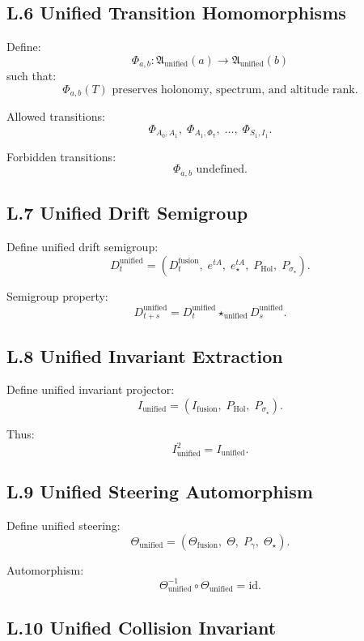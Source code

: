 \subsection*{L.6 Unified Transition Homomorphisms}

Define:
\[
\Phi_{a,b} :
\mathfrak{A}_{\mathrm{unified}}(a)
\to
\mathfrak{A}_{\mathrm{unified}}(b)
\]
such that:
\[
\Phi_{a,b}(T)
\text{ preserves holonomy, spectrum, and altitude rank}.
\]

Allowed transitions:
\[
\Phi_{A_0,A_1},\;
\Phi_{A_1,\Phi_7},\;
\dots,\;
\Phi_{S_1,I_1}.
\]

Forbidden transitions:
\[
\Phi_{a,b} \text{ undefined}.
\]

\subsection*{L.7 Unified Drift Semigroup}

Define unified drift semigroup:
\[
D_t^{\mathrm{unified}} =
(D_t^{\mathrm{fusion}},\;
e^{tA},\;
e_{\star}^{tA},\;
P_{\mathrm{Hol}},\;
P_{\sigma_{\star}}).
\]

Semigroup property:
\[
D_{t+s}^{\mathrm{unified}}
=
D_t^{\mathrm{unified}}
\star_{\mathrm{unified}}
D_s^{\mathrm{unified}}.
\]

\subsection*{L.8 Unified Invariant Extraction}

Define unified invariant projector:
\[
I_{\mathrm{unified}} =
(I_{\mathrm{fusion}},\;
P_{\mathrm{Hol}},\;
P_{\sigma_{\star}}).
\]

Thus:
\[
I_{\mathrm{unified}}^2 = I_{\mathrm{unified}}.
\]

\subsection*{L.9 Unified Steering Automorphism}

Define unified steering:
\[
\Theta_{\mathrm{unified}} =
(\Theta_{\mathrm{fusion}},\;
\Theta,\;
P_{\gamma},\;
\Theta_{\star}).
\]

Automorphism:
\[
\Theta_{\mathrm{unified}}^{-1}
\circ
\Theta_{\mathrm{unified}}
=
\mathrm{id}.
\]

\subsection*{L.10 Unified Collision Invariant}

